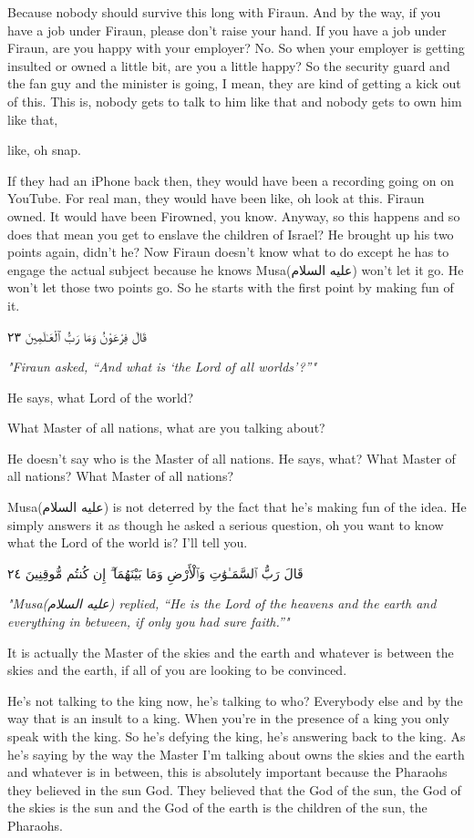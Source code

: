 \documentclass[12pt]{article}
\newcommand{\as}{\textarabic{(عليه السلام)}}
\begin{document}
Because nobody should survive this long with Firaun. And by the way, if you have a job under Firaun, please don't raise your hand. If you have a job under Firaun, are you happy with your employer? No. So when your employer is getting insulted or owned a little bit, are you a little happy? So the security guard and the fan guy and the minister is going, I mean, they are kind of getting a kick out of this. This is, nobody gets to talk to him like that and nobody gets to own him like that, 

like, oh snap. 

If they had an iPhone back then, they would have been a recording going on on YouTube. For real man, they would have been like, oh look at this. Firaun owned. It would have been Firowned, you know. Anyway, so this happens and so does that mean you get to enslave the children of Israel? He brought up his two points again, didn't he? Now Firaun doesn't know what to do except he has to engage the actual subject because he knows Musa\as{} won't let it go. He won't let those two points go. So he starts with the first point by making fun of it. 

\textarabic{قَالَ فِرْعَوْنُ وَمَا رَبُّ ٱلْعَـٰلَمِينَ ٢٣}

\textit{"Firaun asked, “And what is ‘the Lord of all worlds’?”"}

He says, what Lord of the world? 

What Master of all nations, what are you talking about? 

He doesn't say who is the Master of all nations. He says, what? What Master of all nations? What Master of all nations? 

Musa\as{} is not deterred by the fact that he's making fun of the idea. He simply answers it as though he asked a serious question, oh you want to know what the Lord of the world is? I'll tell you. 

\textarabic{قَالَ رَبُّ ٱلسَّمَـٰوَٰتِ وَٱلْأَرْضِ وَمَا بَيْنَهُمَآ ۖ إِن كُنتُم مُّوقِنِينَ ٢٤}

\textit{"Musa\as{} replied, “He is the Lord of the heavens and the earth and everything in between, if only you had sure faith.”"}

It is actually the Master of the skies and the earth and whatever is between the skies and the earth, if all of you are looking to be convinced. 

He's not talking to the king now, he's talking to who? Everybody else and by the way that is an insult to a king. When you're in the presence of a king you only speak with the king. So he's defying the king, he's answering back to the king. As he's saying by the way the Master I'm talking about owns the skies and the earth and whatever is in between, this is absolutely important because the Pharaohs they believed in the sun God. They believed that the God of the sun, the God of the skies is the sun and the God of the earth is the children of the sun, the Pharaohs. 
\end{document}
